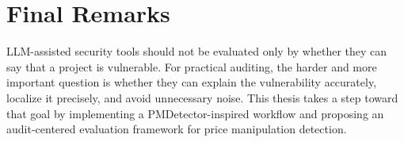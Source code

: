 \section{Final Remarks}

LLM-assisted security tools should not be evaluated only by whether they can
say that a project is vulnerable. For practical auditing, the harder and more
important question is whether they can explain the vulnerability accurately,
localize it precisely, and avoid unnecessary noise. This thesis takes a step
toward that goal by implementing a PMDetector-inspired workflow and proposing
an audit-centered evaluation framework for price manipulation detection.
